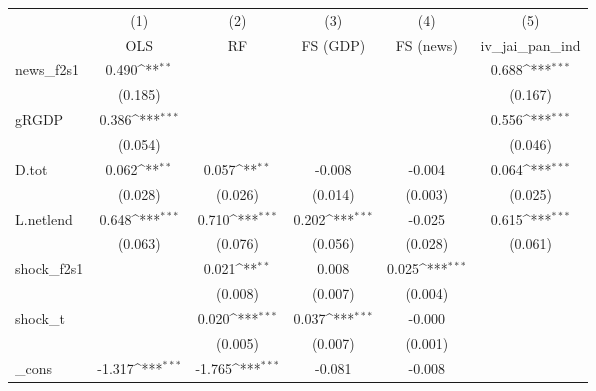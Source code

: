 {
\def\sym#1{\ifmmode^{#1}\else\(^{#1}\)\fi}
\begin{tabular}{l*{5}{c}}
\toprule
            &\multicolumn{1}{c}{(1)}&\multicolumn{1}{c}{(2)}&\multicolumn{1}{c}{(3)}&\multicolumn{1}{c}{(4)}&\multicolumn{1}{c}{(5)}\\
            &\multicolumn{1}{c}{OLS}&\multicolumn{1}{c}{RF}&\multicolumn{1}{c}{FS (GDP)}&\multicolumn{1}{c}{FS (news)}&\multicolumn{1}{c}{iv\_jai\_pan\_ind}\\
\midrule
news\_f2s1   &       0.490\sym{**} &                     &                     &                     &       0.688\sym{***}\\
            &     (0.185)         &                     &                     &                     &     (0.167)         \\
\addlinespace
gRGDP       &       0.386\sym{***}&                     &                     &                     &       0.556\sym{***}\\
            &     (0.054)         &                     &                     &                     &     (0.046)         \\
\addlinespace
D.tot       &       0.062\sym{**} &       0.057\sym{**} &      -0.008         &      -0.004         &       0.064\sym{***}\\
            &     (0.028)         &     (0.026)         &     (0.014)         &     (0.003)         &     (0.025)         \\
\addlinespace
L.netlend   &       0.648\sym{***}&       0.710\sym{***}&       0.202\sym{***}&      -0.025         &       0.615\sym{***}\\
            &     (0.063)         &     (0.076)         &     (0.056)         &     (0.028)         &     (0.061)         \\
\addlinespace
shock\_f2s1  &                     &       0.021\sym{**} &       0.008         &       0.025\sym{***}&                     \\
            &                     &     (0.008)         &     (0.007)         &     (0.004)         &                     \\
\addlinespace
shock\_t     &                     &       0.020\sym{***}&       0.037\sym{***}&      -0.000         &                     \\
            &                     &     (0.005)         &     (0.007)         &     (0.001)         &                     \\
\addlinespace
\_cons      &      -1.317\sym{***}&      -1.765\sym{***}&      -0.081         &      -0.008         &                     \\

\end{tabular}}
